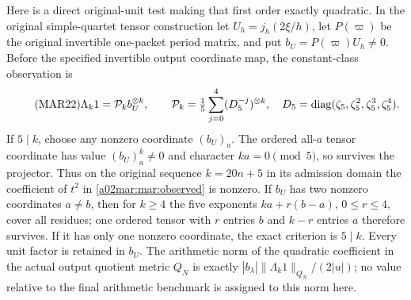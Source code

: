 \documentclass[11pt,a4paper]{article}
\begin{document}
Here is a direct original-unit test making that first order
exactly quadratic. In the original simple-quartet tensor
construction let $U_h=j_h(2\xi/h)$, let $P(\varpi)$ be the
original invertible one-packet period matrix, and put
$b_U=P(\varpi)U_h\ne0$. Before the specified invertible output
coordinate map, the constant-class observation is
\begin{equation}\tag{MAR22}\label{a02mar:mar:constant-survival}
 \Lambda_k1=\mathcal P_k b_U^{\otimes k},\qquad
 \mathcal P_k=\tfrac15\sum_{j=0}^4(D_5^{-j})^{\otimes k},
 \quad D_5=\operatorname{diag}(\zeta_5,\zeta_5^2,\zeta_5^3,\zeta_5^4).
\end{equation}
If $5\mid k$, choose any nonzero coordinate $(b_U)_a$.
The ordered all-$a$ tensor coordinate has value $(b_U)_a^k\ne0$
and character $ka=0\pmod5$, so survives the projector. Thus on
the original sequence $k=20n+5$ in its admission domain the
coefficient of $t^2$ in \eqref{a02mar:mar:observed} is nonzero.
If $b_U$ has two nonzero coordinates $a\ne b$, then for $k\ge4$
the five exponents $ka+r(b-a)$, $0\le r\le4$, cover all residues;
one ordered tensor with $r$ entries $b$ and $k-r$ entries $a$
therefore survives. If it has only one nonzero coordinate, the
exact criterion is $5\mid k$. Every unit factor is retained in
$b_U$. The arithmetic norm of the quadratic coefficient in the
actual output quotient metric $Q_N$ is exactly
$|b_\lambda|\|\Lambda_k1\|_{Q_N}/(2|u|)$; no value relative to
the final arithmetic benchmark is assigned to this norm here.
\end{document}
